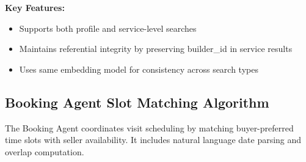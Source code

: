 \textbf{Key Features:}
\begin{itemize}
    \item Supports both profile and service-level searches
    \item Maintains referential integrity by preserving builder\_id in service results
    \item Uses same embedding model for consistency across search types
\end{itemize}

\subsection{Booking Agent Slot Matching Algorithm}

The Booking Agent coordinates visit scheduling by matching buyer-preferred time slots with seller availability. It includes natural language date parsing and overlap computation.

